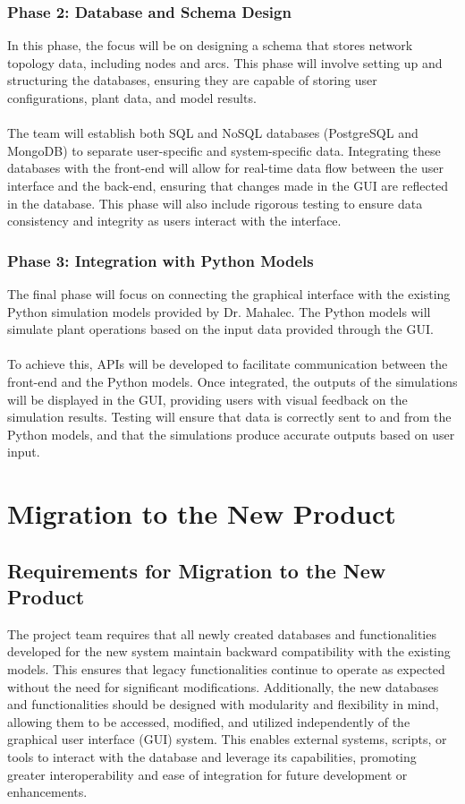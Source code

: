 \documentclass[12pt]{article}
\begin{document}
\subsubsection{Phase 2: Database and Schema Design}
In this phase, the focus will be on designing a schema that stores network topology data, including nodes and arcs. This phase will involve setting up and structuring the databases, ensuring they are capable of storing user configurations, plant data, and model results.\\\\
The team will establish both SQL and NoSQL databases (PostgreSQL and MongoDB) to separate user-specific and system-specific data. Integrating these databases with the front-end will allow for real-time data flow between the user interface and the back-end, ensuring that changes made in the GUI are reflected in the database. This phase will also include rigorous testing to ensure data consistency and integrity as users interact with the interface.

\subsubsection{Phase 3: Integration with Python Models}
The final phase will focus on connecting the graphical interface with the existing Python simulation models provided by Dr. Mahalec. The Python models will simulate plant operations based on the input data provided through the GUI.\\\\
To achieve this, APIs will be developed to facilitate communication between the front-end and the Python models. Once integrated, the outputs of the simulations will be displayed in the GUI, providing users with visual feedback on the simulation results. Testing will ensure that data is correctly sent to and from the Python models, and that the simulations produce accurate outputs based on user input.

\section{Migration to the New Product}
\subsection{Requirements for Migration to the New Product}

The project team requires that all newly created databases and functionalities developed for the new system maintain backward compatibility with the existing models. This ensures that legacy functionalities continue to operate as expected without the need for significant modifications. Additionally, the new databases and functionalities should be designed with modularity and flexibility in mind, allowing them to be accessed, modified, and utilized independently of the graphical user interface (GUI) system. This enables external systems, scripts, or tools to interact with the database and leverage its capabilities, promoting greater interoperability and ease of integration for future development or enhancements.
\end{document}
